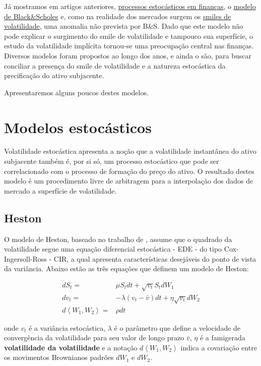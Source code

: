 \documentclass[]{book}
\theoremstyle{definition}
\theoremstyle{definition}
\theoremstyle{definition}
\theoremstyle{remark}
\begin{document}
Já mostramos em artigos anteriores,
\protect\hyperlink{processos-estocasticos}{processos estocásticos em
finanças}, o \protect\hyperlink{bsm}{modelo de Black\&Scholes} e, como
na realidade dos mercados surgem os \protect\hyperlink{smile}{smiles de
volatilidade}, uma anomalia não prevista por B\&S. Dado que este modelo
não pode explicar o surgimento do smile de volatilidade e tampouco sua
superfície, o estudo da volatilidade implícita tornou-se uma preocupação
central nas finanças. Diversos modelos foram propostos ao longo dos
anos, e ainda o são, para buscar conciliar a presença do smile de
volatilidade e a natureza estocástica da precificação do ativo
subjacente.

Apresentaremos alguns poucos destes modelos.

\section{Modelos estocásticos}\label{modelos-estocasticos}

Volatilidade estocástica apresenta a noção que a volatilidade
instantânea do ativo subjacente também é, por si só, um processo
estocástico que pode ser correlacionado com o processo de formação do
preço do ativo. O resultado destes modelo é um procedimento livre de
arbitragem para a interpolação dos dados de mercado a superfície de
volatilidade.

\subsection{Heston}\label{heston}

O modelo de Heston, baseado no trabalho de \citet{Heston1993}, assume
que o quadrado da volatilidade segue uma equação diferencial estocástica
- EDE - do tipo Cox-Ingersoll-Ross - CIR, a qual apresenta
características desejáveis do ponto de vista da variância. Abaixo estão
as três equações que definem um modelo de Heston:

\begin{equation}
\begin{aligned}
dS_t=&\mu S_t dt + \sqrt{v_t}S_t dW_1\\
dv_t=&-\lambda(v_t-\bar v)dt+\eta\sqrt{v_t}dW_2\\
d\left\langle W_1, W_2 \right\rangle=&\rho dt
\end{aligned}
\label{eq:heston}
\end{equation}

onde \(v_t\) é a variância estocástica, \(\lambda\) é o parâmetro que
define a velocidade de convergência da volatilidade para seu valor de
longo prazo \(\bar v\), \(\eta\) é a famigerada \textbf{volatilidade da
volatilidade} e a notação \(d\left\langle W_1, W_2 \right\rangle\)
indica a covariação entre os movimentos Brownianos padrões \(dW_1\) e
\(dW_2\).
\end{document}
